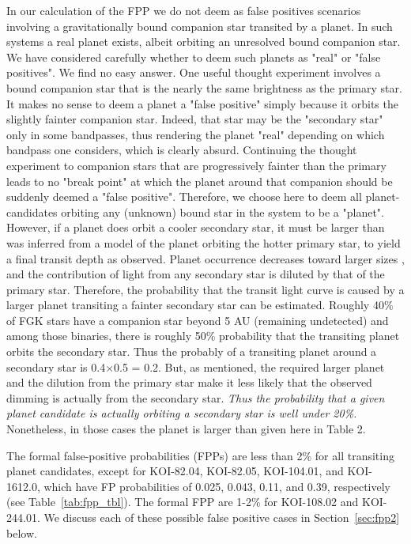 \documentclass{emulateapj}
\begin{document}
In our calculation of the FPP we do not deem as false positives
scenarios involving a gravitationally bound companion star transited
by a planet.  In such systems a real planet exists, albeit orbiting an
unresolved bound companion star.  We have considered carefully whether
to deem such planets as "real" or "false positives".  We find no easy
answer.  One useful thought experiment involves a bound companion star
that is the nearly the same brightness as the primary star.  It makes
no sense to deem a planet a "false positive" simply because it orbits
the slightly fainter companion star.  Indeed, that star may be the
"secondary star" only in some bandpasses, thus rendering the planet
"real" depending on which bandpass one considers, which is clearly
absurd.  Continuing the thought experiment to companion stars that are
progressively fainter than the primary leads to no "break point" at
which the planet around that companion should be suddenly deemed a
"false positive".  Therefore, we choose here to deem all planet-candidates
orbiting any (unknown) bound star in the system to be a "planet".
However, if a planet does orbit a cooler secondary star,
it must be larger than was inferred from a model of the planet
orbiting the hotter primary star, to yield a final transit depth as
observed.  Planet occurrence decreases toward larger sizes
\citep{Howard2012}, and the contribution of light from any
secondary star is diluted by that of the primary star.  Therefore, the probability
that the transit light curve is caused by a larger planet transiting a
fainter secondary star can be estimated.  Roughly 40\% of FGK stars
have a companion star beyond 5 AU (remaining undetected) and among
those binaries, there is roughly 50\% probability that the transiting
planet orbits the secondary star.  Thus the probably of a transiting
planet around a secondary star is 0.4$\times$0.5 = 0.2.  But, as
mentioned, the required larger planet and the dilution from the
primary star make it less likely that the observed dimming is actually
from the secondary star.  {\it Thus the probability that a given  
planet candidate is actually orbiting a secondary star is well under 20\%.}
Nonetheless, in those cases the planet is larger than given here in
Table 2.

The formal false-positive probabilities (FPPs) are less than 2\% for
 all transiting planet candidates, except for KOI-82.04, KOI-82.05,
 KOI-104.01, and KOI-1612.0, which have FP probabilities of 0.025,
 0.043, 0.11, and 0.39, respectively (see Table~\ref{tab:fpp_tbl}).
  The formal FPP are 1-2\% for KOI-108.02 and KOI-244.01.  We discuss
 each of these possible false positive cases in Section~\ref{sec:fpp2}
 below.
 
\end{document}
